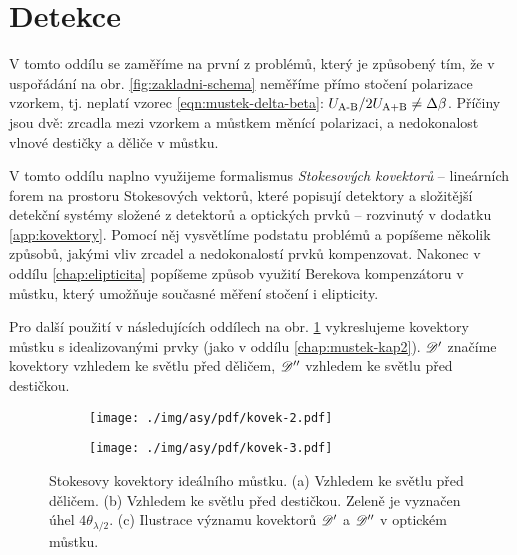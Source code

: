 \section{Detekce}
\label{chap:detekce}

V tomto oddílu se zaměříme na první z problémů, který je způsobený tím, že v uspořádání na obr. \ref{fig:zakladni-schema} neměříme přímo stočení polarizace vzorkem, tj. neplatí vzorec \eqref{eqn:mustek-delta-beta}: $U_\textrm{A-B}/2U_\textrm{A+B}\neq\Delta\beta$.
Příčiny jsou dvě: zrcadla mezi vzorkem a můstkem měnící polarizaci, a nedokonalost vlnové destičky a děliče v můstku.

V tomto oddílu naplno využijeme formalismus \emph{Stokesových kovektorů} -- lineárních forem na prostoru Stokesových vektorů, které popisují detektory a složitější detekční systémy složené z detektorů a optických prvků -- rozvinutý v dodatku \ref{app:kovektory}.
Pomocí něj vysvětlíme podstatu problémů a popíšeme několik způsobů, jakými vliv zrcadel a nedokonalostí prvků kompenzovat.
Nakonec v oddílu \ref{chap:elipticita} popíšeme způsob využití Berekova kompenzátoru v můstku, který umožňuje současné měření stočení i elipticity.

Pro další použití v následujících oddílech na obr. \ref{fig:kovektor-ideal-mustek} vykreslujeme kovektory můstku s idealizovanými prvky (jako v oddílu \ref{chap:mustek-kap2}).
$\mathscr{D}'$ značíme kovektory vzhledem ke světlu před děličem, $\mathscr{D}''$ vzhledem ke světlu před destičkou.

\begin{figure}[htbp]
    \centering
    \begin{subfigure}{.35\textwidth}
        \centering
        \texttt{[image: ./img/asy/pdf/kovek-2.pdf]}
    \end{subfigure}%
    \begin{subfigure}{.34\textwidth}
        \centering
        \texttt{[image: ./img/asy/pdf/kovek-3.pdf]}
    \end{subfigure}%
    \begin{subfigure}{.3\textwidth}
        \centering
    \end{subfigure}
    \caption{Stokesovy kovektory ideálního můstku. (a) Vzhledem ke světlu před děličem. (b) Vzhledem ke světlu před destičkou. Zeleně je vyznačen úhel $4\theta_{\lambda/2}$. (c) Ilustrace významu kovektorů $\mathscr{D}'$ a $\mathscr{D}''$ v optickém můstku.}
    \label{fig:kovektor-ideal-mustek}
\end{figure}

